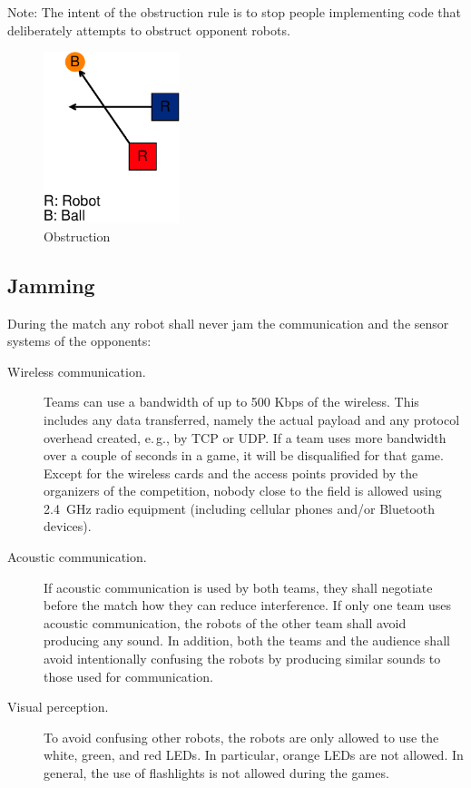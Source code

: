 \documentclass[12pt]{article}
\newcommand{\eg}{\mbox{e.\,g.}\xspace}
\begin{document}
 Note:  The intent of the obstruction rule is to stop people
 implementing code that deliberately attempts to obstruct opponent
 robots. 

 \begin{figure}[t]
 \centerline{\includegraphics[height=5cm]{figs/obstruction}}
 \caption{Obstruction}\label{fig:obstruction}
 \end{figure}

\subsection{Jamming}

During the match any robot shall never jam the communication and the
sensor systems of the opponents:

\begin{description}

\item[Wireless communication.] Teams can use a bandwidth of up to 500 Kbps
of the wireless. This includes any data transferred, namely the actual
payload and any protocol overhead created, \eg, by TCP or UDP. If a team
uses more bandwidth over a couple of seconds in a game, it will be disqualified for that game.
Except for the wireless cards and the access points provided by the
organizers of the competition, nobody close to the field is allowed
using 2.4~GHz radio equipment (including cellular phones and/or
Bluetooth devices).
\item[Acoustic communication.] If acoustic communication is used by both
teams, they shall negotiate before the match
how they can reduce interference. If only one team uses acoustic
communication, the robots of the other team shall avoid producing
any sound. In addition, both the teams and the audience shall avoid
intentionally confusing the robots by producing similar sounds to
those used for communication.
\item[Visual perception.] To avoid confusing other robots, the robots are
only allowed to use the white, green, and red LEDs. In particular, orange LEDs
are not allowed. In general, the use of flashlights is not allowed
during the games.
\end{description}
\end{document}
